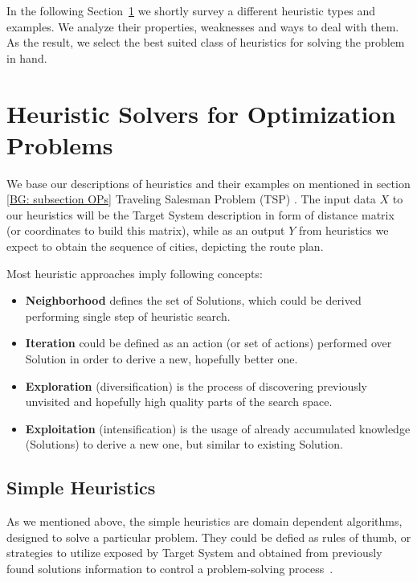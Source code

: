 In the following Section~\ref{bg: section heuristics} we shortly survey a different heuristic types and examples. We analyze their properties, weaknesses and ways to deal with them. As the result, we select the best suited class of heuristics for solving the problem in hand.


\section{Heuristic Solvers for Optimization Problems}\label{bg: section heuristics}
We base our descriptions of heuristics and their examples on mentioned in section \ref{BG: subsection OPs} Traveling Salesman Problem (TSP) \cite{applegate2006traveling}. The input data $X$ to our heuristics will be the Target System description in form of distance matrix (or coordinates to build this matrix), while as an output $Y$ from heuristics we expect to obtain the sequence of cities, depicting the route plan.


Most heuristic approaches imply following concepts:
\begin{itemize}[itemsep=8pt]
	\item \textbf{Neighborhood} defines the set of Solutions, which could be derived performing single step of heuristic search.
	\item \textbf{Iteration} could be defined as an action (or set of actions) performed over Solution in order to derive a new, hopefully better one.
	\item \textbf{Exploration} (diversification) is the process of discovering previously unvisited and hopefully high quality parts of the search space.
	\item \textbf{Exploitation} (intensification) is the usage of already accumulated knowledge (Solutions) to derive a new one, but similar to existing Solution.
\end{itemize}


\subsection{Simple Heuristics}
As we mentioned above, the simple heuristics are domain dependent algorithms, designed to solve a particular problem.
They could be defied as rules of thumb, or strategies to utilize exposed by Target System and obtained from previously found solutions information to control a problem-solving process~\cite{pearl1984intelligent}. 

